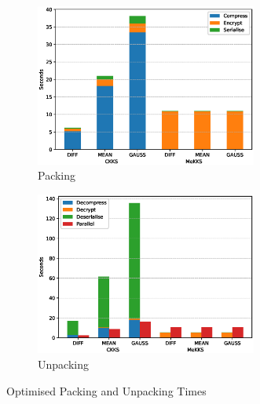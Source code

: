 \begin{figure}[h!]
    \centering
    \begin{subfigure}[b]{0.495\textwidth}
        \centering
        \includegraphics[width=0.8\textwidth]{figures/packingTimes}
        \caption{Packing}
    \end{subfigure}
    \hfill
    \begin{subfigure}[b]{0.495\textwidth}
        \centering
        \includegraphics[width=0.8\textwidth]{figures/unpackingTimes}
        \caption{Unpacking}
    \end{subfigure}
    \caption{Optimised Packing and Unpacking Times}
    \label{fig:packingAndUnpackingGraph}
\end{figure}
